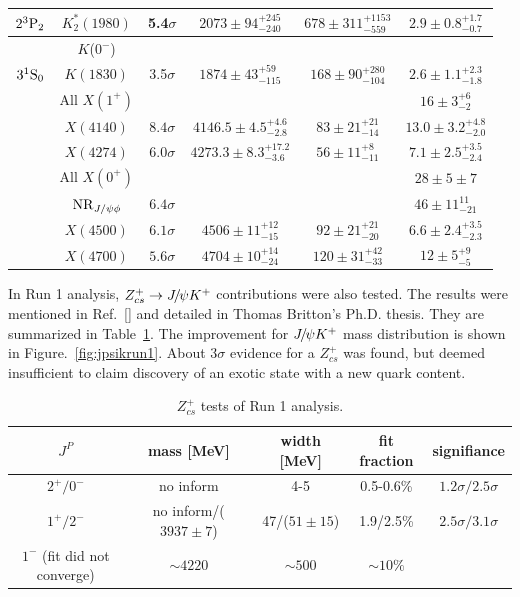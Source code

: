 \begin{table}[h]
\begin{tabular}{cccccc}
$2{}^{3}{\rm P}_{2}$  &  $K^*_2(1980)$   & 5.4$\sigma$       &  $2073\pm 94^{+245}_{-240} $   &   $678\pm 311^{+1153}_{-559} $   & $2.9 \pm 0.8^{+1.7}_{-0.7 }$   \\  
\hline 
& $K$($0^-$) \\
$3{}^{1}{\rm S}_{0}$  &  $K(1830)$    & 3.5$\sigma$       &  $1874\pm 43^{+59}_{-115} $   &   $168\pm 90^{+280}_{-104} $   & $2.6 \pm 1.1^{+2.3}_{-1.8 }$    \\  
\hline\hline
 & All $X(1^+)$ & & & &$16\pm 3^{+6}_{-2}$ \\
 & $X(4140)$ & $8.4\sigma$ & $4146.5\pm 4.5^{+4.6}_{-2.8}$ & $83 \pm 21^{+21}_{-14}$ & $13.0\pm 3.2^{+4.8}_{-2.0}$\\
 & $X(4274)$ & $6.0\sigma$ & $4273.3\pm 8.3^{+17.2}_{-3.6}$ & $56 \pm 11^{+8}_{-11}$ & $7.1\pm 2.5^{+3.5}_{-2.4}$\\
\hline
 & All $X(0^+)$ & & & &$28\pm 5 \pm 7$ \\
  & ${\rm NR}_{J/\psi \phi}$ & $6.4 \sigma $& & &$46\pm 11^{11}_{-21}$  \\
 & $X(4500)$ & $6.1\sigma$ & $4506\pm 11^{+12}_{-15}$ & $92 \pm 21^{+21}_{-20}$ & $6.6\pm 2.4^{+3.5}_{-2.3}$ \\
 & $X(4700)$ & $5.6\sigma$ & $4704\pm 10^{+14}_{-24}$ & $120 \pm 31^{+42}_{-33}$ & $12\pm 5^{+9}_{-5}$ \\
\hline

\end{tabular}
\normalsize
\end{table}

In Run 1 analysis, $Z_{cs}^+\rightarrow {\ensuremath{{J\mskip -3mu/\mskip -2mu\psi}}} K^+$ contributions were also tested. 
The results were mentioned in Ref.~[\cite{LHCb-PAPER-2016-019}] and detailed in Thomas Britton's Ph.D. thesis\supercite{ThomasBritton:2016}. 
They are summarized in Table~\ref{tab:hahaha}. 
The improvement for ${{J\mskip -3mu/\mskip -2mu\psi}} K^+$ mass distribution is shown in Figure.~\ref{fig:jpsikrun1}.  
About $3\sigma$ evidence for a $Z_{cs}^+$ was found, but deemed insufficient to claim discovery of an exotic state with a new quark content. 

\begin{table}[h]
\caption{$Z_{cs}^+$ tests of \lhcb Run 1 analysis\supercite{ThomasBritton:2016}.}
\begin{center}
\begin{tabular}{ccccc}
\hline
$J^P$ & mass [MeV] & width [MeV] & fit fraction & signifiance \\
\hline \hline
$2^+ / 0^-$ & no inform & 4-5 & 0.5-0.6\% & $1.2\sigma/2.5\sigma$ \\
$1^+ / 2^-$ & no inform/($3937\pm7$) & 47/($51\pm15$) & 1.9/2.5\% & $2.5\sigma / 3.1\sigma$ \\
$1^-$ (fit did not converge) & $\sim4220$ & $\sim 500$ & $\sim 10\%$ & \\
\hline
\end{tabular}
\normalsize
\label{tab:hahaha}
\end{center}
\end{table}

